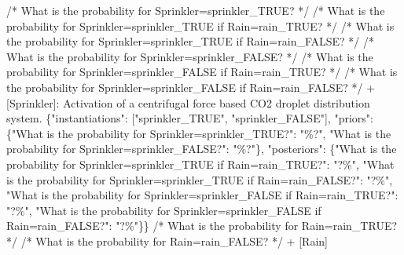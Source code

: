 \documentclass[
  11pt,
  letterpaper,
  openany]{book}
\newenvironment{Shaded}{\begin{snugshade}}{\end{snugshade}}
\newcommand{\DataTypeTok}[1]{\textcolor[rgb]{0.68,0.00,0.00}{#1}}
\newcommand{\ErrorTok}[1]{\textcolor[rgb]{0.68,0.00,0.00}{#1}}
\newcommand{\FunctionTok}[1]{\textcolor[rgb]{0.28,0.35,0.67}{#1}}
\newcommand{\OtherTok}[1]{\textcolor[rgb]{0.00,0.23,0.31}{#1}}
\newcommand{\StringTok}[1]{\textcolor[rgb]{0.13,0.47,0.30}{#1}}
\begin{document}
\begin{landscape}
\begin{Shaded}
\begin{Highlighting}[]
        \ErrorTok{/*} \ErrorTok{What} \ErrorTok{is} \ErrorTok{the} \ErrorTok{probability} \ErrorTok{for} \ErrorTok{Sprinkler=sprinkler\_TRUE?} \ErrorTok{*/}
        \ErrorTok{/*} \ErrorTok{What} \ErrorTok{is} \ErrorTok{the} \ErrorTok{probability} \ErrorTok{for} \ErrorTok{Sprinkler=sprinkler\_TRUE} \ErrorTok{if} \ErrorTok{Rain=rain\_TRUE?} \ErrorTok{*/}
        \ErrorTok{/*} \ErrorTok{What} \ErrorTok{is} \ErrorTok{the} \ErrorTok{probability} \ErrorTok{for} \ErrorTok{Sprinkler=sprinkler\_TRUE} \ErrorTok{if} \ErrorTok{Rain=rain\_FALSE?} \ErrorTok{*/}
        \ErrorTok{/*} \ErrorTok{What} \ErrorTok{is} \ErrorTok{the} \ErrorTok{probability} \ErrorTok{for} \ErrorTok{Sprinkler=sprinkler\_FALSE?} \ErrorTok{*/}
        \ErrorTok{/*} \ErrorTok{What} \ErrorTok{is} \ErrorTok{the} \ErrorTok{probability} \ErrorTok{for} \ErrorTok{Sprinkler=sprinkler\_FALSE} \ErrorTok{if} \ErrorTok{Rain=rain\_TRUE?} \ErrorTok{*/}
        \ErrorTok{/*} \ErrorTok{What} \ErrorTok{is} \ErrorTok{the} \ErrorTok{probability} \ErrorTok{for} \ErrorTok{Sprinkler=sprinkler\_FALSE} \ErrorTok{if} \ErrorTok{Rain=rain\_FALSE?} \ErrorTok{*/}
        \ErrorTok{+} \OtherTok{[}\ErrorTok{Sprinkler}\OtherTok{]}\ErrorTok{:} \ErrorTok{Activation} \ErrorTok{of} \ErrorTok{a} \ErrorTok{centrifugal} \ErrorTok{force} \ErrorTok{based} \ErrorTok{CO2} \ErrorTok{droplet} \ErrorTok{distribution} \ErrorTok{system.} \FunctionTok{\{}\DataTypeTok{"instantiations"}\FunctionTok{:} \OtherTok{[}\StringTok{"sprinkler\_TRUE"}\OtherTok{,} \StringTok{"sprinkler\_FALSE"}\OtherTok{]}\FunctionTok{,} \DataTypeTok{"priors"}\FunctionTok{:} \FunctionTok{\{}\DataTypeTok{"What is the probability for Sprinkler=sprinkler\_TRUE?"}\FunctionTok{:} \StringTok{"\%?"}\FunctionTok{,} \DataTypeTok{"What is the probability for Sprinkler=sprinkler\_FALSE?"}\FunctionTok{:} \StringTok{"\%?"}\FunctionTok{\},} \DataTypeTok{"posteriors"}\FunctionTok{:} \FunctionTok{\{}\DataTypeTok{"What is the probability for Sprinkler=sprinkler\_TRUE if Rain=rain\_TRUE?"}\FunctionTok{:} \StringTok{"?\%"}\FunctionTok{,} \DataTypeTok{"What is the probability for Sprinkler=sprinkler\_TRUE if Rain=rain\_FALSE?"}\FunctionTok{:} \StringTok{"?\%"}\FunctionTok{,} \DataTypeTok{"What is the probability for Sprinkler=sprinkler\_FALSE if Rain=rain\_TRUE?"}\FunctionTok{:} \StringTok{"?\%"}\FunctionTok{,} \DataTypeTok{"What is the probability for Sprinkler=sprinkler\_FALSE if Rain=rain\_FALSE?"}\FunctionTok{:} \StringTok{"?\%"}\FunctionTok{\}\}}
            \ErrorTok{/*} \ErrorTok{What} \ErrorTok{is} \ErrorTok{the} \ErrorTok{probability} \ErrorTok{for} \ErrorTok{Rain=rain\_TRUE?} \ErrorTok{*/}
            \ErrorTok{/*} \ErrorTok{What} \ErrorTok{is} \ErrorTok{the} \ErrorTok{probability} \ErrorTok{for} \ErrorTok{Rain=rain\_FALSE?} \ErrorTok{*/}
            \ErrorTok{+} \OtherTok{[}\ErrorTok{Rain}\OtherTok{]}
\end{Highlighting}
\end{Shaded}


\end{landscape}
\end{document}
